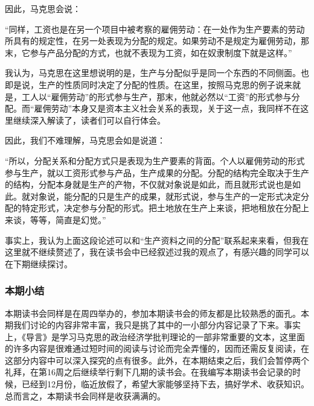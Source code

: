 \documentclass[a4paper,twoside,12pt,AutoFakeBold]{ctexart}
\begin{document}
因此，马克思会说：
\begin{adjustwidth}{2em}{2em}
    \qquad\fangsong
    “同样，工资也是在另一个项目中被考察的雇佣劳动：在一处作为生产要素的劳动所具有的规定性，在另一处表现为分配的规定。如果劳动不是规定为雇佣劳动，那末，它参与产品分配的方式，也就不表现为工资，如在奴隶制度下就是这样。”
\end{adjustwidth}
我认为，马克思在这里想说明的是，生产与分配似乎是同一个东西的不同侧面。也即是说，生产的性质同时决定了分配的性质。在这里，按照马克思的例子说来就是，工人以“雇佣劳动”的形式参与生产，那末，他就必然以“工资”的形式参与分配。而“雇佣劳动”本身又是资本主义社会关系的表现，关于这一点，我同样不在这里继续深入解读了，读者们可以自行体会。

因此，我们不难理解，马克思会如是说道：
\begin{adjustwidth}{2em}{2em}
    \qquad\fangsong
    “所以，分配关系和分配方式只是表现为生产要素的背面。个人以雇佣劳动的形式参与生产，就以工资形式参与产品，生产成果的分配。分配的结构完全取决于生产的结构，分配本身就是生产的产物，不仅就对象说是如此，而且就形式说也是如此。就对象说，能分配的只是生产的成果，就形式说，参与生产的一定形式决定分配的特定形式，决定参与分配的形式。把土地放在生产上来谈，把地租放在分配上来谈，等等，简直是幻觉。”
\end{adjustwidth}

\vspace{0.5cm}

事实上，我认为上面这段论述可以和“生产资料之间的分配”联系起来来看，但我在这里就不继续赘述了，我在读书会中已经叙述过我的观点了，有感兴趣的同学可以在下期继续探讨。

\subsubsection{本期小结}
本期读书会同样是在周四举办的，参加本期读书会的师友都是比较熟悉的面孔。本期我们讨论的内容非常丰富，我只是挑了其中的一小部分内容记录了下来。事实上，《导言》是学习马克思的政治经济学批判理论的一部非常重要的文本，这里面的许多内容是很难通过短时间的阅读与讨论而完全弄懂的，因而还需反复阅读，在这部分内容中可以深入探究的点有很多。此外，在本期结束之后，我们会暂停两个礼拜，在第16周之后继续举行剩下几期的读书会。在我编写本期读书会记录的时候，已经到12月份，临近放假了，希望大家能够坚持下去，搞好学术、收获知识。总而言之，本期读书会同样是收获满满的。
\end{document}
